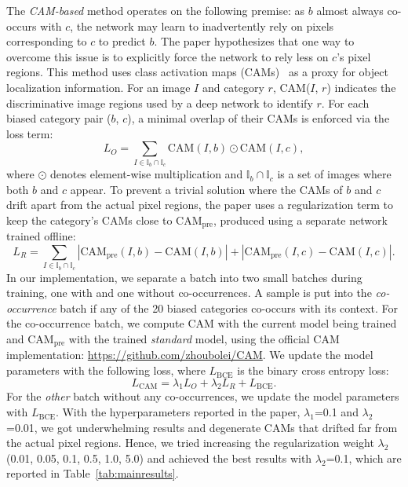 The \emph{CAM-based} method operates on the following premise: as $b$ almost always co-occurs with $c$, the network may learn to inadvertently rely on pixels corresponding to $c$ to predict $b$. The paper hypothesizes that one way to overcome this issue is to explicitly force the network to rely less on $c$'s pixel regions. This method uses class activation maps (CAMs)~\cite{zhou2015cnnlocalization} as a proxy for object localization information. For an image $I$ and category $r$, CAM($I$, $r$) indicates the discriminative image regions used by a deep network to identify $r$. For each biased category pair ($b$, $c$), a minimal overlap of their CAMs is enforced via the loss term:
\begin{equation} \label{eq:Lo}
    L_O = \textstyle\sum_{I \in \mathbb{I}_b 	\cap \mathbb{I}_c} \text{CAM}(I, b) \odot \text{CAM}(I, c),
\end{equation}
where $\odot$ denotes element-wise multiplication and $\mathbb{I}_b \cap \mathbb{I}_c$ is a set of images where both $b$ and $c$ appear. To prevent a trivial solution where the CAMs of $b$ and $c$ drift apart from the actual pixel regions, the paper uses a regularization term to keep the category's CAMs close to CAM$_{\text{pre}}$, produced using a separate network trained offline:
\begin{equation}
    L_R = \textstyle\sum_{I \in \mathbb{I}_b 	\cap \mathbb{I}_c} |\text{CAM}_\text{pre}(I, b) - \text{CAM}(I, b)| + |\text{CAM}_\text{pre}(I, c) - \text{CAM}(I, c)|.
\end{equation}
In our implementation, we separate a batch into two small batches during training, one with and one without co-occurrences. A sample is put into the \emph{co-occurrence} batch if any of the 20 biased categories co-occurs with its context. For the co-occurrence batch, we compute CAM with the current model being trained and CAM$_{\text{pre}}$ with the trained \emph{standard} model, using the official CAM implementation: \url{https://github.com/zhoubolei/CAM}. We update the model parameters with the following loss, where $L_\text{BCE}$ is the binary cross entropy loss:
\begin{equation}\label{eq:cam}
L_\text{CAM} = \lambda_1 L_O + \lambda_2 L_R + L_\text{BCE}.
\end{equation}
For the \emph{other} batch without any co-occurrences, we update the model parameters with $L_\text{BCE}$. 
With the hyperparameters reported in the paper, $\lambda_1$=0.1 and $\lambda_2$=0.01, we got underwhelming results and degenerate CAMs that drifted far from the actual pixel regions. Hence, we tried increasing the regularization weight $\lambda_2$ (0.01, 0.05, 0.1, 0.5, 1.0, 5.0) and achieved the best results with $\lambda_2$=0.1, which are reported in Table~\ref{tab:mainresults}. 

